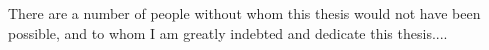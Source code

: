 
\begin{thesisacknowledgments}      

There are a number of people without whom this thesis would not have been possible, and to whom I am greatly indebted and dedicate this thesis....


\end{thesisacknowledgments}                       
